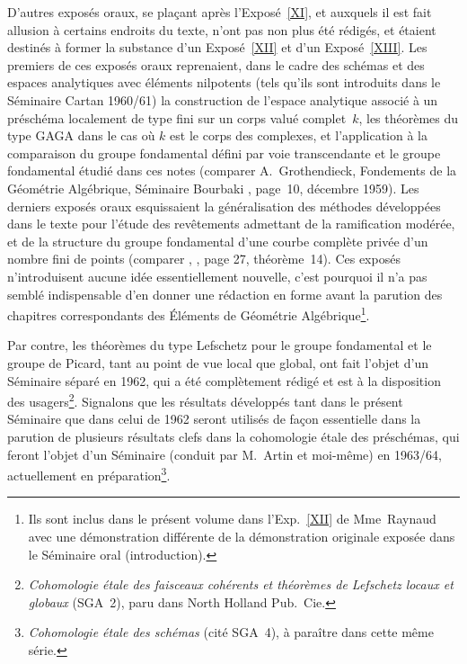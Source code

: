 D'autres expos\'es oraux, se pla\c cant apr\`es l'Expos\'e~\ref{XI},
et auxquels il est fait allusion \`a certains endroits du texte,
n'ont pas non plus \'et\'e r\'edig\'es, et \'etaient
destin\'es \`a former la substance d'un Expos\'e~\ref{XII} et d'un
Expos\'e~\ref{XIII}. Les premiers de ces expos\'es oraux reprenaient,
dans le cadre des sch\'emas et des espaces analytiques avec
\'el\'ements nilpotents (tels qu'ils sont introduits dans le
S\'eminaire Cartan 1960/61) la construction de l'espace analytique associ\'e
\`a un pr\'esch\'ema localement de type fini sur un corps
valu\'e complet~$k$, les th\'eor\`emes du type GAGA dans le cas
o\`u $k$ est le corps des complexes, et l'application \`a la
comparaison du groupe fondamental d\'efini par voie transcendante et
le groupe fondamental \'etudi\'e dans ces notes (comparer
A.\, Grothendieck, Fondements de la G\'eom\'etrie Alg\'ebrique,
S\'eminaire Bourbaki , page~10, d\'ecembre 1959). Les
derniers expos\'es oraux esquissaient la g\'en\'eralisation des
m\'ethodes d\'evelopp\'ees dans le texte pour l'\'etude des
rev\^etements admettant de la ramification mod\'er\'ee, et de la
structure du groupe fondamental d'une courbe compl\`ete priv\'ee
d'un nombre fini de points (comparer \loccit, , page 27,
th\'eor\`eme~14). Ces expos\'es n'introduisent aucune id\'ee
essentiellement nouvelle, c'est pourquoi il n'a pas sembl\'e
indispensable d'en donner une r\'edaction en forme avant la parution
des chapitres correspondants des \'El\'ements de G\'eom\'etrie
Alg\'ebrique\footnote{Ils sont inclus dans le pr\'esent volume
dans l'Exp.\, \ref{XII} de Mme~Raynaud avec une d\'emonstration
diff\'erente de la d\'emonstration originale expos\'ee dans le
S\'eminaire oral (\cf introduction).}.

Par contre, les th\'eor\`emes du type Lefschetz pour le groupe
fondamental et le groupe de Picard, tant au point de vue local que
global, ont fait l'objet d'un S\'eminaire s\'epar\'e en 1962,
qui a \'et\'e compl\`etement r\'edig\'e et est \`a la
disposition des usagers\footnote{\emph{Cohomologie étale des
faisceaux cohérents et théorèmes de Lefschetz locaux et
globaux} (SGA~2), paru dans North Holland Pub.\ Cie.}. Signalons que
les r\'esultats d\'evelopp\'es tant dans le pr\'esent
S\'eminaire que dans celui de 1962 seront utilis\'es de fa\c con
essentielle dans la parution de plusieurs r\'esultats clefs dans la
cohomologie \'etale des pr\'esch\'emas, qui feront l'objet d'un
S\'eminaire (conduit par M.\, Artin et moi-m\^eme) en 1963/64,
actuellement en pr\'eparation\footnote{\emph{Cohomologie étale
des schémas} (cit\'e SGA~4), \`a para\^itre dans cette
m\^eme s\'erie.}.

